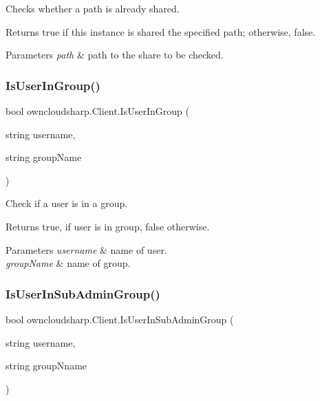 Checks whether a path is already shared. 

\begin{DoxyReturn}{Returns}
{\ttfamily true} if this instance is shared the specified path; otherwise, {\ttfamily false}.
\end{DoxyReturn}

\begin{DoxyParams}{Parameters}
{\em path} & path to the share to be checked.\\
\hline
\end{DoxyParams}
\mbox{\label{classowncloudsharp_1_1_client_a3ad615fa0f35fe632d80a8149c8cad74}} 
\subsubsection{\texorpdfstring{Is\+User\+In\+Group()}{IsUserInGroup()}}
{\footnotesize\ttfamily bool owncloudsharp.\+Client.\+Is\+User\+In\+Group (\begin{DoxyParamCaption}\item[{string}]{username,  }\item[{string}]{group\+Name }\end{DoxyParamCaption})}



Check if a user is in a group. 

\begin{DoxyReturn}{Returns}
{\ttfamily true}, if user is in group, {\ttfamily false} otherwise.
\end{DoxyReturn}

\begin{DoxyParams}{Parameters}
{\em username} & name of user.\\
\hline
{\em group\+Name} & name of group.\\
\hline
\end{DoxyParams}
\mbox{\label{classowncloudsharp_1_1_client_a62e091c3df9d3dcd40794b89de04e481}} 
\subsubsection{\texorpdfstring{Is\+User\+In\+Sub\+Admin\+Group()}{IsUserInSubAdminGroup()}}
{\footnotesize\ttfamily bool owncloudsharp.\+Client.\+Is\+User\+In\+Sub\+Admin\+Group (\begin{DoxyParamCaption}\item[{string}]{username,  }\item[{string}]{group\+Nname }\end{DoxyParamCaption})}



